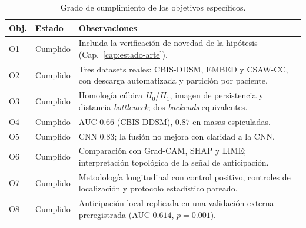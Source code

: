 \begin{table}[H]
\centering
\caption{Grado de cumplimiento de los objetivos específicos.}
\label{tab:cumplimiento}
\begin{tabular}{@{}p{1.3cm}p{2.6cm}p{10.1cm}@{}}
\toprule
\textbf{Obj.} & \textbf{Estado} & \textbf{Observaciones} \\
\midrule
O1 & Cumplido & Incluida la verificación de novedad de la hipótesis
               (Cap.~\ref{cap:estado-arte}). \\
O2 & Cumplido & Tres datasets reales: CBIS-DDSM, EMBED y CSAW-CC, con
               descarga automatizada y partición por paciente. \\
O3 & Cumplido & Homología cúbica $H_0$/$H_1$, imagen de persistencia y
               distancia \textit{bottleneck}; dos \textit{backends}
               equivalentes. \\
O4 & Cumplido & AUC $0.66$ (CBIS-DDSM), $0.87$ en masas espiculadas. \\
O5 & Cumplido & CNN $0.83$; la fusión no mejora con claridad a la CNN. \\
O6 & Cumplido & Comparación con Grad-CAM, SHAP y LIME; interpretación
               topológica de la señal de anticipación. \\
O7 & Cumplido & Metodología longitudinal con control positivo, controles de
               localización y protocolo estadístico pareado. \\
O8 & Cumplido & Anticipación local replicada en una validación externa
               preregistrada (AUC $0.614$, $p = 0.001$). \\
\bottomrule
\end{tabular}
\end{table}

